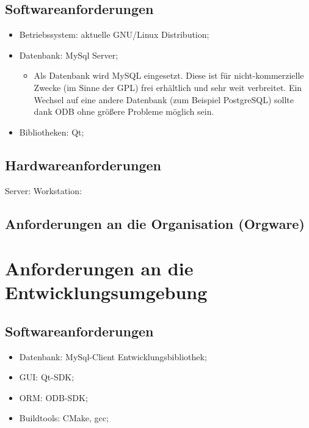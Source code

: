 \documentclass[a4paper,10pt]{article}
\begin{document}
\subsection{Softwareanforderungen}
\begin{itemize}
 \item Betriebssystem: aktuelle GNU/Linux Distribution;
 \item Datenbank: MySql Server;
 \begin{itemize}
  \item Als Datenbank wird MySQL eingesetzt. Diese ist für nicht-kommerzielle Zwecke (im Sinne der GPL) frei erhältlich und sehr weit verbreitet. 
Ein Wechsel auf eine andere Datenbank (zum Beispiel PostgreSQL) sollte dank ODB ohne größere Probleme möglich sein.
 \end{itemize}
 \item Bibliotheken: Qt;
\end{itemize}
\subsection{Hardwareanforderungen}
Server:
Workstation:
\subsection{Anforderungen an die Organisation (Orgware)}

\section{Anforderungen an die Entwicklungsumgebung}
\subsection{Softwareanforderungen}
\begin{itemize}
 \item Datenbank: MySql-Client Entwicklungsbibliothek;
 \item GUI: Qt-SDK; 
 \item ORM: ODB-SDK;
 \item Buildtools: CMake,  gcc;
\end{itemize}
\end{document}
